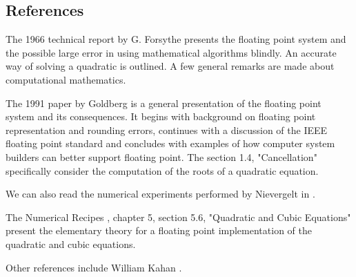 \subsection{References}

The 1966 technical report by G. Forsythe \cite{Forsythe1966} 
presents the floating point system and the possible large error 
in using mathematical algorithms blindly. An accurate way of solving 
a quadratic is outlined. A few general remarks are made about 
computational mathematics. 

The 1991 paper by Goldberg \cite{WhatEveryComputerScientist} is a general presentation of the floating
point system and its consequences. It begins with background on floating point 
representation and rounding errors, continues with a discussion
of the IEEE floating point standard and concludes with examples of how
computer system builders can better support floating point. The section
1.4, "Cancellation" specifically consider the computation of the roots
of a quadratic equation.

We can also read the numerical experiments performed by Nievergelt in \cite{Nievergelt2003}.

The Numerical Recipes \cite{NumericalRecipes}, chapter 5, section 5.6,
"Quadratic and Cubic Equations" present the elementary theory 
for a floating point implementation of the quadratic and cubic equations.

Other references include William Kahan \cite{Kahan2004}.


